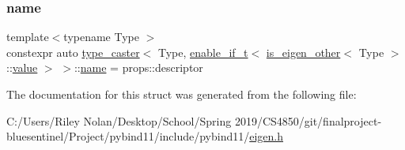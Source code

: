 \subsubsection{\texorpdfstring{name}{name}}
{\footnotesize\ttfamily template$<$typename Type $>$ \\
constexpr auto \mbox{\hyperlink{classtype__caster}{type\+\_\+caster}}$<$ Type, \mbox{\hyperlink{detail_2common_8h_a012819c9e8b5e04872a271f50f8b8196}{enable\+\_\+if\+\_\+t}}$<$ \mbox{\hyperlink{eigen_8h_a7be1c6745b73821227ddafd46d41c583}{is\+\_\+eigen\+\_\+other}}$<$ Type $>$\+::\mbox{\hyperlink{_s_d_l__opengl__glext_8h_a8ad81492d410ff2ac11f754f4042150f}{value}} $>$ $>$\+::\mbox{\hyperlink{structname}{name}} = props\+::descriptor\hspace{0.3cm}{\ttfamily [static]}}



The documentation for this struct was generated from the following file\+:\begin{DoxyCompactItemize}
\item 
C\+:/\+Users/\+Riley Nolan/\+Desktop/\+School/\+Spring 2019/\+C\+S4850/git/finalproject-\/bluesentinel/\+Project/pybind11/include/pybind11/\mbox{\hyperlink{eigen_8h}{eigen.\+h}}\end{DoxyCompactItemize}
